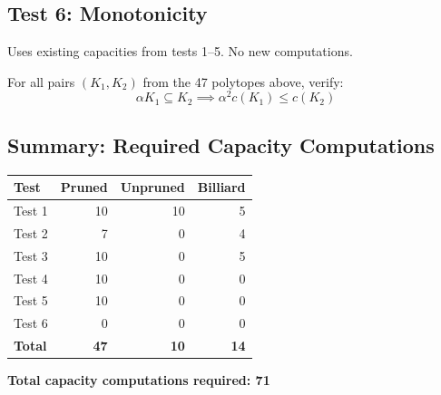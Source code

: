 \documentclass{article}
\begin{document}
\subsection*{Test 6: Monotonicity}

Uses existing capacities from tests 1--5. No new computations.

For all pairs $(K_1, K_2)$ from the 47 polytopes above, verify:
$$\alpha K_1 \subseteq K_2 \implies \alpha^2 c(K_1) \leq c(K_2)$$

\subsection*{Summary: Required Capacity Computations}

\begin{tabular}{lrrr}
\toprule
Test & Pruned & Unpruned & Billiard \\
\midrule
Test 1 & 10 & 10 & 5 \\
Test 2 & 7 & 0 & 4 \\
Test 3 & 10 & 0 & 5 \\
Test 4 & 10 & 0 & 0 \\
Test 5 & 10 & 0 & 0 \\
Test 6 & 0 & 0 & 0 \\
\midrule
\textbf{Total} & \textbf{47} & \textbf{10} & \textbf{14} \\
\bottomrule
\end{tabular}

\textbf{Total capacity computations required: 71}
\end{document}
